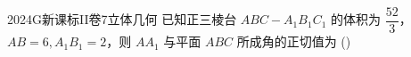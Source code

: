 
\begin{problem}{2024}{G}{新课标II卷}{7}{立体几何}
已知正三棱台 $ABC-A_1B_1C_1$ 的体积为 $\dfrac{52}{3}$，$AB=6, A_1B_1=2$，则 $AA_1$ 与平面 $ABC$ 所成角的正切值为
(\hspace{1cm})
\begin{choices}
\end{choices}
\end{problem}